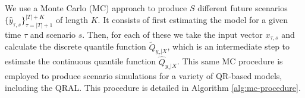 We use a Monte Carlo (MC) approach to produce $S$ different future scenarios $\{ \hat{y}_{\tau,s} \}_{\tau=|T|+1}^{|T|+K}$ of length $K$. It consists of first estimating the model for a given time $\tau$ and scenario $s$. Then, for each of these we take the input vector $x_{\tau,s}$ and calculate the discrete quantile function $\tilde{Q}_{y_{\tau}|X}$, which is an intermediate step to estimate the continuous quantile function $\hat{Q}_{y_{\tau}|X}$. 
This same MC procedure is employed to produce scenario simulations for a variety of QR-based models, including the QRAL. This procedure is detailed in Algorithm \ref{alg:mc-procedure}.


